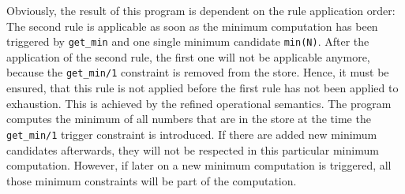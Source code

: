 Obviously, the result of this program is dependent on the rule application order: The second rule is applicable as soon as the minimum computation has been triggered by \lstinline|get_min| and one single minimum candidate \lstinline|min(N)|. After the application of the second rule, the first one will not be applicable anymore, because the \lstinline|get_min/1| constraint is removed from the store. Hence, it must be ensured, that this rule is not applied before the first rule has not been applied to exhaustion. This is achieved by the refined operational semantics. The program computes the minimum of all numbers that are in the store at the time the \lstinline|get_min/1| trigger constraint is introduced. If there are added new minimum candidates afterwards, they will not be respected in this particular minimum computation. However, if later on a new minimum computation is triggered, all those minimum constraints will be part of the computation.


